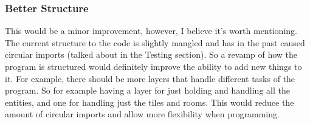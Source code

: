 \documentclass[../Main.tex]{subfiles}
\begin{document}
        \subsubsection{Better Structure}
            This would be a minor improvement, however, I believe it's worth mentioning. The current structure to the code is slightly mangled and has in the past caused circular imports (talked about in the Testing section). So a revamp of how the program is structured would definitely improve the ability to add new things to it. For example, there should be more layers that handle different tasks of the program. So for example having a layer for just holding and handling all the entities, and one for handling just the tiles and rooms. This would reduce the amount of circular imports and allow more flexibility when programming.
\end{document}
